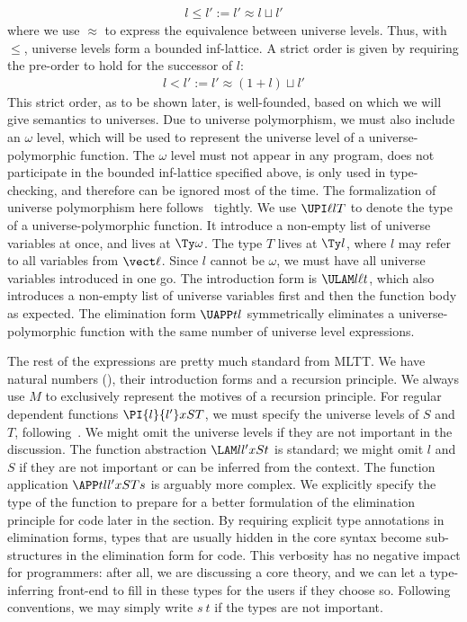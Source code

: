 \begin{align*}
  l \le l' := l' \approx l \sqcup l'
\end{align*}
where we use $\approx$ to express the equivalence between universe levels. %
Thus, with $\le$, universe levels form a bounded inf-lattice. %
A strict order is given by requiring the pre-order to hold for the successor of $l$:
\begin{align*}
  l < l' := l' \approx (1 + l) \sqcup l'
\end{align*}
This strict order, as to be shown later, is well-founded, based on which we will give
semantics to universes. %
Due to universe polymorphism, we must also include an $\omega$ level, which will be
used to represent the universe level of a universe-polymorphic function. %
The $\omega$ level must not appear in any program, does not participate in the bounded
inf-lattice specified above, is only used in type-checking, and therefore can be
ignored most of the time. %
The formalization of universe polymorphism here follows~\citet{bezem_type_2023}
tightly. %
We use $\UPI \ell l T$ to denote the type of a universe-polymorphic function. %
It introduce a non-empty list of universe variables at once, and lives at $\Ty
\omega$. %
The type $T$ lives at $\Ty l$, where $l$ may refer to all variables from $\vect
\ell$. %
Since $l$ cannot be $\omega$, we must have all universe variables introduced in one
go. %
The introduction form is $\ULAM l \ell t$, which also introduces a non-empty list of
universe variables first and then the function body as expected. %
The elimination form $\UAPP t l$ symmetrically eliminates a universe-polymorphic
function with the same number of universe level expressions. %

The rest of the expressions are pretty much standard from MLTT. %
We have natural numbers (\Nat), their introduction forms and a recursion principle. %
We always use $M$ to exclusively represent the motives of a recursion principle. %
For regular dependent functions $\PI{l}{l'}x S T$, we must specify the universe levels
of $S$ and $T$, following~\citet{pujet_impredicative_2023}. %
We might omit the universe levels if they are not important in the discussion. %
The function abstraction $\LAM l{l'} x S t$ is standard; we might omit $l$ and $S$ if they
are not important or can be inferred from the context. %
The function application $\APP t l{l'} x S T s$ is arguably more complex. %
We explicitly specify the type of the function to prepare for a better formulation of
the elimination principle for code later in the section. %
By requiring explicit type annotations in elimination forms, types that are usually
hidden in the core syntax become 
sub-structures in the elimination form for code. %
This verbosity has no negative impact for programmers: after all, we are discussing a core theory, and
we can let a type-inferring front-end to fill in these types for the users if they
choose so. %
Following conventions, we may simply write $s~t$ if the types are not important. %


